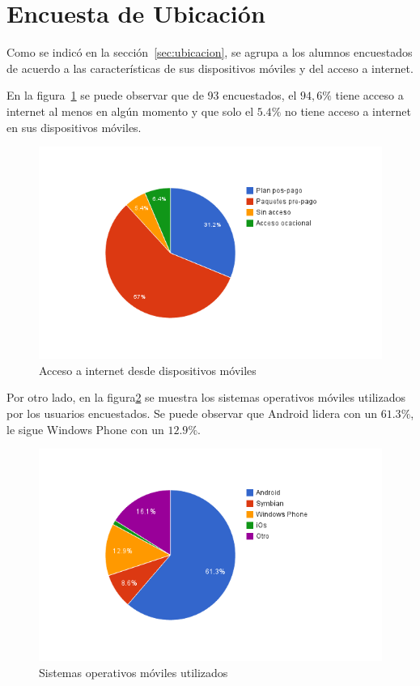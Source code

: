 

\section{Encuesta de Ubicación}
\label{sec:res_UBICACION}

Como se indicó en la sección~\ref{sec:ubicacion}, se agrupa a los alumnos encuestados
de acuerdo a las características de sus dispositivos móviles y del acceso a internet.

En la figura~\ref{fig:ubicacion_acceso_internet} se puede observar que de 93 encuestados, 
el $94,6\%$ tiene acceso a internet al menos en algún momento y que solo el $5.4\%$ no tiene
acceso a internet en sus dispositivos móviles.

\begin{figure}[ht!]
\centering
\includegraphics[scale=0.8]{resultados/imagenes/ubicacion_acceso_internet.png}
\caption{Acceso a internet desde dispositivos móviles}
\label{fig:ubicacion_acceso_internet}
\end{figure}

Por otro lado, en la figura\ref{fig:ubicacion_sistemas_operativos} se muestra los sistemas 
operativos móviles utilizados por los usuarios encuestados. Se puede observar que Android 
lidera con un $61.3\%$, le sigue Windows Phone con un $12.9\%$.

\begin{figure}[ht!]
\centering
\includegraphics[scale=0.8]{resultados/imagenes/ubicacion_sistemas_operativos.png}
\caption{Sistemas operativos móviles utilizados}
\label{fig:ubicacion_sistemas_operativos}
\end{figure}

